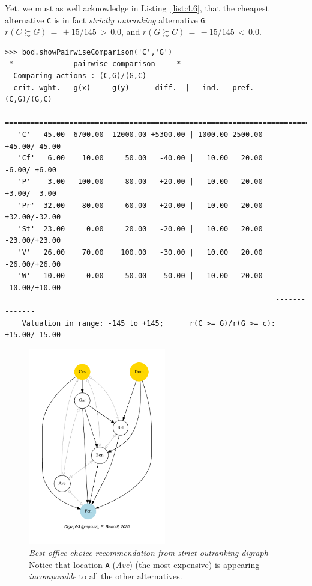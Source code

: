 Yet, we must as well acknowledge in Listing~\vref{list:4.6}, that the cheapest alternative \texttt{C} is in fact \emph{strictly outranking} alternative \texttt{G}:  $r(C \succsim G)\, =\, +15/145\, >\, 0.0$, and $r(G \succsim C)\, =\, -15/145 \,<\, 0.0$.
\begin{lstlisting}[caption={Inspecting pairwise comparison between alternatives \texttt{C} and \texttt{G}},label=list:4.6,basicstyle=\ttfamily\scriptsize]
>>> bod.showPairwiseComparison('C','G')
 *------------  pairwise comparison ----*
  Comparing actions : (C,G)/(G,C)
  crit. wght.   g(x)     g(y)      diff.  |   ind.   pref.       (C,G)/(G,C)
   ==========================================================================
   'C'   45.00 -6700.00 -12000.00 +5300.00 | 1000.00 2500.00    +45.00/-45.00 
   'Cf'   6.00    10.00     50.00   -40.00 |   10.00   20.00     -6.00/ +6.00 
   'P'    3.00   100.00     80.00   +20.00 |   10.00   20.00     +3.00/ -3.00 
   'Pr'  32.00    80.00     60.00   +20.00 |   10.00   20.00    +32.00/-32.00 
   'St'  23.00     0.00     20.00   -20.00 |   10.00   20.00    -23.00/+23.00 
   'V'   26.00    70.00    100.00   -30.00 |   10.00   20.00    -26.00/+26.00 
   'W'   10.00     0.00     50.00   -50.00 |   10.00   20.00    -10.00/+10.00
                                                               --------------
    Valuation in range: -145 to +145;      r(C >= G)/r(G >= c): +15.00/-15.00
\end{lstlisting}
\begin{figure}[ht]
\sidecaption[t]
\includegraphics[width=6cm]{Figures/4-3-bestOfficeChoice.pdf}
\caption[Best office choice recommendation from strict outranking digraph]{\emph{Best office choice recommendation from strict outranking digraph}\\ Notice that location \texttt{A} (\emph{Ave}) (the most expensive) is appearing \emph{incomparable} to all the other alternatives.}
\label{fig:4.3}       %
\end{figure}

